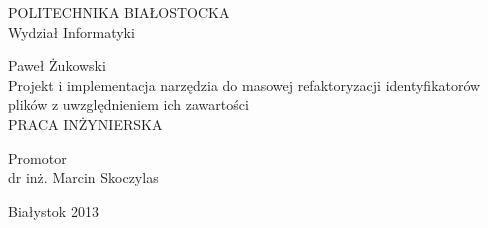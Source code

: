 \begin{titlepage}
	\begin{center}
	\vspace{3cm}
	\fontsize{25pt}{31pt}\selectfont
	POLITECHNIKA BIAŁOSTOCKA \\
	\vspace*{.5\baselineskip}
	\fontsize{24pt}{18pt}\selectfont
	Wydział Informatyki

	\vspace*{3\baselineskip}
	\fontsize{32pt}{20pt}\selectfont
	Paweł Żukowski\\
	\vspace*{\baselineskip}
	\fontsize{20pt}{15pt}\selectfont
	Projekt i implementacja narzędzia do masowej refaktoryzacji identyfikatorów plików z uwzględnieniem ich zawartości\\
	\vspace*{\baselineskip}
	\fontsize{15pt}{18pt}\selectfont
	PRACA INŻYNIERSKA \\
	\end{center}
	\vspace*{\baselineskip}
	\vspace*{3\baselineskip}
	\begin{flushright}
	\fontsize{18pt}{10pt}\selectfont
	Promotor\\
	dr inż. Marcin Skoczylas\\
	\end{flushright}
	
	\vspace*{4\baselineskip}
	\begin{center}
	Białystok 2013
	\end{center}

%
%
%
%
%
%

\end{titlepage}
